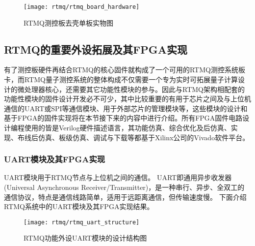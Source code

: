 \begin{figure}
    \centering
    \texttt{[image: rtmq/rtmq\_board\_hardware]}
    \caption[RTMQ测控板去壳单板实物图]{RTMQ测控板去壳单板实物图\label{fig:rtmq_board_hardware}}
\end{figure}

\newpage
\subsection[RTMQ的重要外设拓展及其FPGA实现]{RTMQ的重要外设拓展及其FPGA实现}

有了测控板硬件再结合RTMQ的核心固件就构成了一个可用的RTMQ测控系统板卡，而RTMQ量子测控系统的整体构成不仅需要一个专为实时可拓展量子计算设计的微处理器核心，还需要其它功能性模块的参与。因此与RTMQ架构相配套的功能性模块的固件设计开发必不可少，其中比较重要的有用于芯片之间及与上位机通信的UART或SPI等通信模块、用于外部芯片的管理模块等，这些模块的设计和基于FPGA的固件实现将在本节接下来的内容中进行介绍。所有FPGA固件电路设计编程使用的皆是Verilog硬件描述语言，其功能仿真、综合优化及后仿真、实现、布线后仿真、板级仿真、调试与下载等都基于Xilinx公司的Vivado软件平台。




\subsubsection[UART模块及其FPGA实现]{UART模块及其FPGA实现}
UART模块用于RTMQ节点与上位机之间的通信。
UART即通用异步收发器(Universal Asynchronous Receiver/Transmitter)，是一种串行、异步、全双工的通信协议，特点是通信线路简单，适用于远距离通信，但传输速度慢。
下面介绍RTMQ系统中的UART模块及其FPGA实现结果。

\begin{figure}
    \centering
    \texttt{[image: rtmq/rtmq\_uart\_structure]}
    \caption[RTMQ功能外设UART模块的设计结构图]{RTMQ功能外设UART模块的设计结构图\label{fig:rtmq_uart_structure}}
\end{figure}

